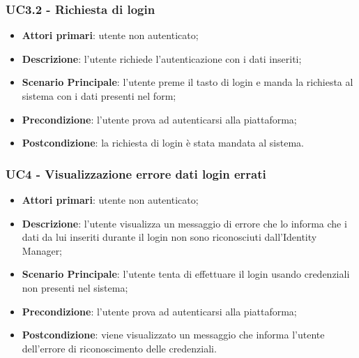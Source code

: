 \subsubsection{UC3.2 - Richiesta di login}
\begin{itemize}
\item \textbf{Attori primari}: utente non autenticato;
\item \textbf{Descrizione}: l'utente richiede l'autenticazione con i dati inseriti;
\item \textbf{Scenario Principale}: l'utente preme il tasto di login e manda la richiesta al sistema con i dati presenti nel form;
\item \textbf{Precondizione}: l'utente prova ad autenticarsi alla piattaforma;
\item \textbf{Postcondizione}: la richiesta di login è stata mandata al sistema.
\end{itemize} 

\subsubsection{UC4 - Visualizzazione errore dati login errati}
\begin{itemize}
\item \textbf{Attori primari}: utente non autenticato;
\item \textbf{Descrizione}: l'utente visualizza un messaggio di errore che lo informa che i dati da lui inseriti durante il login non sono riconosciuti dall'Identity Manager;
\item \textbf{Scenario Principale}: l'utente tenta di effettuare il login usando credenziali non presenti nel sistema;
\item \textbf{Precondizione}: l'utente prova ad autenticarsi alla piattaforma;
\item \textbf{Postcondizione}: viene visualizzato un messaggio che informa l'utente dell'errore di riconoscimento delle credenziali.
\end{itemize}